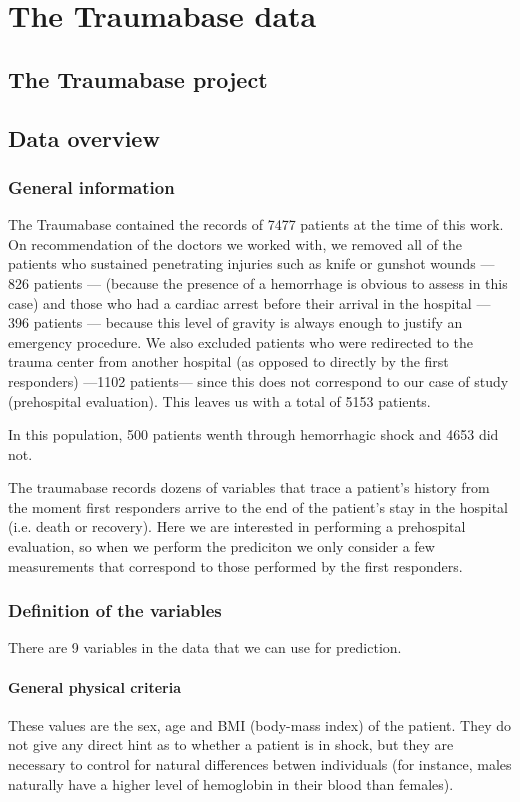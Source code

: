 	\section{The Traumabase data}
	\label{traumabase}
		\subsection{The Traumabase project}
	
		\subsection{Data overview}
		
			\subsubsection{General information}
The Traumabase contained the records of 7477 patients at the time of this work. On recommendation of the doctors we worked with, we removed all of the patients who sustained penetrating injuries such as knife or gunshot wounds --- 826 patients --- (because the presence of a hemorrhage is obvious to assess in this case) and those who had a cardiac arrest before their arrival in the hospital --- 396 patients --- because this level of gravity is always enough to justify an emergency procedure. We also excluded patients who were redirected to the trauma center from another hospital (as opposed to directly by the first responders) ---1102 patients--- since this does not correspond to our case of study (prehospital evaluation). This leaves us with a total of 5153 patients.

In this population, 500 patients wenth through hemorrhagic shock and 4653 did not.
			
The traumabase records dozens of variables that trace a patient's history from the moment first responders arrive to the end of the patient's stay in the hospital (i.e. death or recovery). Here we are interested in performing a prehospital evaluation, so when we perform the prediciton we only consider a few measurements that correspond to those performed by the first responders. 

			\subsubsection{Definition of the variables}
There are 9 variables in the data that we can use for prediction.
\paragraph{General physical criteria}
These values are the sex, age and BMI (body-mass index) of the patient. They do not give any direct hint as to whether a patient is in shock, but they are necessary to control for natural differences betwen individuals (for instance, males naturally have a higher level of hemoglobin in their blood than females).

